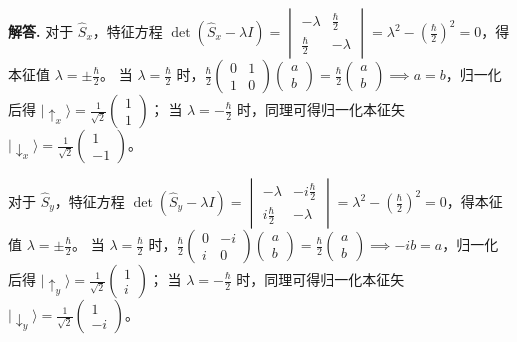 \documentclass[12pt, a4paper, oneside]{ctexart}
\newenvironment{solution}{\par\noindent\textbf{解答. }}{\par}
\begin{document}
\begin{solution}
    对于 $\hat{S}_x$，特征方程 $\det(\hat{S}_x - \lambda I) = \begin{vmatrix} -\lambda & \frac{\hbar}{2} \\ \frac{\hbar}{2} & -\lambda \end{vmatrix} = \lambda^2 - \left(\frac{\hbar}{2}\right)^2 = 0$，得本征值 $\lambda = \pm \frac{\hbar}{2}$。
    当 $\lambda = \frac{\hbar}{2}$ 时，$\frac{\hbar}{2}\begin{pmatrix} 0 & 1 \\ 1 & 0 \end{pmatrix} \begin{pmatrix} a \\ b \end{pmatrix} = \frac{\hbar}{2} \begin{pmatrix} a \\ b \end{pmatrix} \implies a=b$，归一化后得 $|\uparrow_x\rangle = \frac{1}{\sqrt{2}}\begin{pmatrix} 1 \\ 1 \end{pmatrix}$；
    当 $\lambda = -\frac{\hbar}{2}$ 时，同理可得归一化本征矢 $|\downarrow_x\rangle = \frac{1}{\sqrt{2}}\begin{pmatrix} 1 \\ -1 \end{pmatrix}$。
    
    对于 $\hat{S}_y$，特征方程 $\det(\hat{S}_y - \lambda I) = \begin{vmatrix} -\lambda & -i\frac{\hbar}{2} \\ i\frac{\hbar}{2} & -\lambda \end{vmatrix} = \lambda^2 - \left(\frac{\hbar}{2}\right)^2 = 0$，得本征值 $\lambda = \pm \frac{\hbar}{2}$。
    当 $\lambda = \frac{\hbar}{2}$ 时，$\frac{\hbar}{2}\begin{pmatrix} 0 & -i \\ i & 0 \end{pmatrix} \begin{pmatrix} a \\ b \end{pmatrix} = \frac{\hbar}{2} \begin{pmatrix} a \\ b \end{pmatrix} \implies -ib=a$，归一化后得 $|\uparrow_y\rangle = \frac{1}{\sqrt{2}}\begin{pmatrix} 1 \\ i \end{pmatrix}$；
    当 $\lambda = -\frac{\hbar}{2}$ 时，同理可得归一化本征矢 $|\downarrow_y\rangle = \frac{1}{\sqrt{2}}\begin{pmatrix} 1 \\ -i \end{pmatrix}$。
    

\end{solution}
\end{document}

